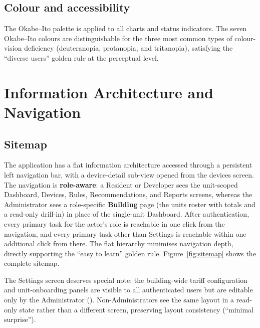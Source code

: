 \subsection{Colour and accessibility}

The Okabe--Ito palette is applied to all charts and status indicators.  The seven
Okabe--Ito colours are distinguishable for the three most common types of colour-vision
deficiency (deuteranopia, protanopia, and tritanopia), satisfying the ``diverse users''
golden rule at the perceptual level.

\section{Information Architecture and Navigation}
\label{sec:ui-ia}

\subsection{Sitemap}

The application has a flat information architecture accessed through a
persistent left navigation bar, with a device-detail sub-view opened from the devices
screen.  The navigation is \textbf{role-aware}: a Resident or Developer sees the
unit-scoped Dashboard, Devices, Rules, Recommendations, and Reports screens, whereas the
Administrator sees a role-specific \textbf{Building} page (the units roster with totals
and a read-only drill-in) in place of the single-unit Dashboard.  After authentication,
every primary task for the actor's role is reachable in one click from the
navigation, and every primary task other than Settings is reachable within one additional
click from there.  The flat hierarchy minimises navigation depth, directly supporting the
``easy to learn'' golden rule.  Figure~\ref{fig:sitemap} shows the complete sitemap.


The Settings screen deserves special note: the building-wide tariff configuration and
unit-onboarding panels are visible to all authenticated users but are editable only by the
Administrator ().  Non-Administrators see the same layout in a read-only state
rather than a different screen, preserving layout consistency (``minimal surprise'').

